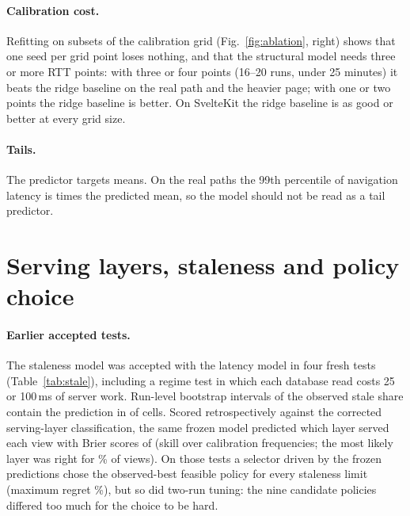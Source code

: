 \documentclass[acmsmall,review,nonacm]{acmart}
\begin{document}
\paragraph{Calibration cost.}
Refitting on subsets of the calibration grid (Fig.~\ref{fig:ablation}, right) shows that one seed per grid point loses nothing, and that the structural model needs three or more RTT points: with three or four points (16--20 runs, under 25 minutes) it beats the ridge baseline on the real path and the heavier page; with one or two points the ridge baseline is better. On SvelteKit the ridge baseline is as good or better at every grid size.

\paragraph{Tails.}
The predictor targets means. On the real paths the 99th percentile of navigation latency is \AfourNavPninetyNine{} times the predicted mean, so the model should not be read as a tail predictor.

\section{Serving layers, staleness and policy choice}
\label{sec:fresh}

\paragraph{Earlier accepted tests.}
The staleness model was accepted with the latency model in four fresh tests (Table~\ref{tab:stale}), including a regime test in which each database read costs 25 or 100\,ms of server work. Run-level bootstrap intervals of the observed stale share contain the prediction in \AfourStaleIn{} of \AfourStaleCells{} cells. Scored retrospectively against the corrected serving-layer classification, the same frozen model predicted which layer served each view with Brier scores of \BoneOffBrier{} (skill \BoneOffSkill{} over calibration frequencies; the most likely layer was right for \BoneOffTop\% of views). On those tests a selector driven by the frozen predictions chose the observed-best feasible policy for every staleness limit (maximum regret \BfourOffMaxRegret\%), but so did two-run tuning: the nine candidate policies differed too much for the choice to be hard.

\begin{table}[t]
\centering\small
\caption{Earlier accepted staleness tests: pooled mean absolute error, worst cell, correct orderings and, for the regime experiment, latency error.}
\label{tab:stale}

\end{table}
\end{document}
